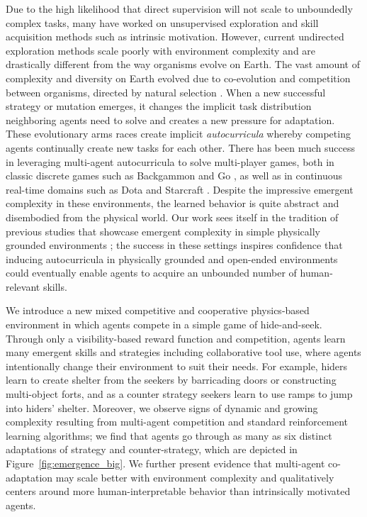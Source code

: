 Due to the high likelihood that direct supervision will not scale to unboundedly complex tasks, many have worked on unsupervised exploration and skill acquisition methods such as intrinsic motivation.
However, current undirected exploration methods scale poorly with environment complexity and are drastically different from the way organisms evolve on Earth.  
The vast amount of complexity and diversity on Earth evolved due to co-evolution and competition between organisms, directed by natural selection \citep{dawkins1979}.
When a new successful strategy or mutation emerges, it changes the implicit task distribution neighboring agents need to solve and creates a new pressure for adaptation.
These evolutionary arms races create implicit \textit{autocurricula} \citep{leibo2019autocurricula} whereby competing agents continually create new tasks for each other.
There has been much success in leveraging multi-agent autocurricula to solve multi-player games, both in classic discrete games such as Backgammon \citep{tesauro1995} and Go \citep{silver2017mastering}, as well as in continuous real-time domains such as Dota \citep{openai2018} and Starcraft \citep{vinyals2019}.
Despite the impressive emergent complexity in these environments, the learned behavior is quite abstract and disembodied from the physical world.
Our work sees itself in the tradition of previous studies that showcase emergent complexity in simple physically grounded environments \citep{sims1994a, bansal2017, Jaderberg859, liu2019emergent}; the success in these settings inspires confidence that inducing autocurricula in physically grounded and open-ended environments could eventually enable agents to acquire an unbounded number of human-relevant skills.

We introduce a new mixed competitive and cooperative physics-based environment in which agents compete in a simple game of hide-and-seek.
Through only a visibility-based reward function and competition, agents learn many emergent skills and strategies including collaborative tool use, where agents intentionally change their environment to suit their needs.
For example, hiders learn to create shelter from the seekers by barricading doors or constructing multi-object forts, and as a counter strategy seekers learn to use ramps to jump into hiders' shelter.
Moreover, we observe signs of dynamic and growing complexity resulting from multi-agent competition and standard reinforcement learning algorithms; we find that agents go through as many as six distinct adaptations of strategy and counter-strategy, which are depicted in Figure~\ref{fig:emergence_big}.
We further present evidence that multi-agent co-adaptation may scale better with environment complexity and qualitatively centers around more human-interpretable behavior than intrinsically motivated agents.

